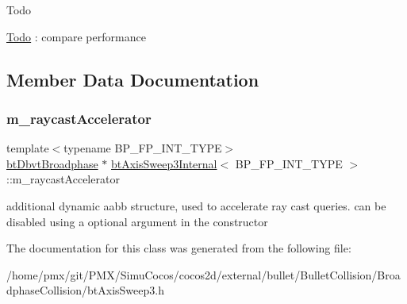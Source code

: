 \begin{DoxyRefDesc}{Todo}
\item[\hyperlink{todo__todo000007}{Todo}]\+: compare performance \end{DoxyRefDesc}


\subsection{Member Data Documentation}
\mbox{\label{classbtAxisSweep3Internal_a059cd72f13ef063c5bcaecb6e46930bc}} 
\subsubsection{\texorpdfstring{m\+\_\+raycast\+Accelerator}{m\_raycastAccelerator}}
{\footnotesize\ttfamily template$<$typename B\+P\+\_\+\+F\+P\+\_\+\+I\+N\+T\+\_\+\+T\+Y\+PE$>$ \\
\hyperlink{structbtDbvtBroadphase}{bt\+Dbvt\+Broadphase} $\ast$ \hyperlink{classbtAxisSweep3Internal}{bt\+Axis\+Sweep3\+Internal}$<$ B\+P\+\_\+\+F\+P\+\_\+\+I\+N\+T\+\_\+\+T\+Y\+PE $>$\+::m\+\_\+raycast\+Accelerator\hspace{0.3cm}{\ttfamily [protected]}}

additional dynamic aabb structure, used to accelerate ray cast queries. can be disabled using a optional argument in the constructor 

The documentation for this class was generated from the following file\+:\begin{DoxyCompactItemize}
\item 
/home/pmx/git/\+P\+M\+X/\+Simu\+Cocos/cocos2d/external/bullet/\+Bullet\+Collision/\+Broadphase\+Collision/bt\+Axis\+Sweep3.\+h\end{DoxyCompactItemize}
